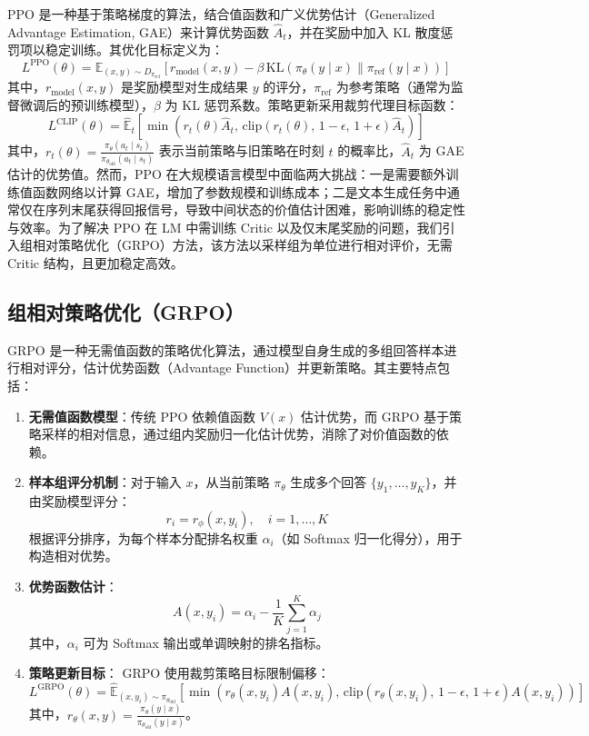 \documentclass{pkuthesis}
\begin{document}
PPO 是一种基于策略梯度的算法，结合值函数和广义优势估计（Generalized Advantage Estimation, GAE）来计算优势函数 \( \hat{A}_t \)，并在奖励中加入 KL 散度惩罚项以稳定训练。其优化目标定义为：
\[
L^{\text{PPO}}(\theta) = \mathbb{E}_{(x, y) \sim D_{\pi_{\text{ref}}}} \left[ r_{\text{model}}(x, y) - \beta \, \text{KL}(\pi_{\theta}(y \mid x) \| \pi_{\text{ref}}(y \mid x)) \right]
\]
其中，\( r_{\text{model}}(x, y) \) 是奖励模型对生成结果 \( y \) 的评分，\( \pi_{\text{ref}} \) 为参考策略（通常为监督微调后的预训练模型），\( \beta \) 为 KL 惩罚系数。策略更新采用裁剪代理目标函数：
\[
L^{\text{CLIP}}(\theta) = \hat{\mathbb{E}}_t \left[ \min \left( r_t(\theta) \hat{A}_t, \, \text{clip}(r_t(\theta), \, 1 - \epsilon, \, 1 + \epsilon) \hat{A}_t \right) \right]
\]
其中，\( r_t(\theta) = \frac{\pi_{\theta}(a_t \mid s_t)}{\pi_{\theta_{\text{old}}}(a_t \mid s_t)} \) 表示当前策略与旧策略在时刻 \( t \) 的概率比，\( \hat{A}_t \) 为 GAE 估计的优势值。然而，PPO 在大规模语言模型中面临两大挑战：一是需要额外训练值函数网络以计算 GAE，增加了参数规模和训练成本；二是文本生成任务中通常仅在序列末尾获得回报信号，导致中间状态的价值估计困难，影响训练的稳定性与效率。为了解决 PPO 在 LM 中需训练 Critic 以及仅末尾奖励的问题，我们引入组相对策略优化（GRPO）方法，该方法以采样组为单位进行相对评价，无需 Critic 结构，且更加稳定高效。

\subsection{组相对策略优化（GRPO）}
GRPO \cite{shao2024deepseekmath}是一种无需值函数的策略优化算法，通过模型自身生成的多组回答样本进行相对评分，估计优势函数（Advantage Function）并更新策略。其主要特点包括：
\begin{enumerate}
    \item \textbf{无需值函数模型}：传统 PPO 依赖值函数 \( V(x) \) 估计优势，而 GRPO 基于策略采样的相对信息，通过组内奖励归一化估计优势，消除了对价值函数的依赖。
    \item \textbf{样本组评分机制}：对于输入 \( x \)，从当前策略 \( \pi_{\theta} \) 生成多个回答 \( \{y_1, \dots, y_K\} \)，并由奖励模型评分：
    \[
    r_i = r_{\phi}(x, y_i), \quad i = 1, \dots, K
    \]
    根据评分排序，为每个样本分配排名权重 \( \alpha_i \)（如 Softmax 归一化得分），用于构造相对优势。
    \item \textbf{优势函数估计}：
    \[
    A(x, y_i) = \alpha_i - \frac{1}{K} \sum_{j=1}^K \alpha_j
    \]
    其中，\( \alpha_i \) 可为 Softmax 输出或单调映射的排名指标。
    \item \textbf{策略更新目标}：
    GRPO 使用裁剪策略目标限制偏移：
    \[
    L^{\text{GRPO}}(\theta) = \hat{\mathbb{E}}_{(x, y_i) \sim \pi_{\theta_{\text{old}}}} \left[ \min \left( r_{\theta}(x, y_i) A(x, y_i), \, \text{clip}(r_{\theta}(x, y_i), \, 1 - \epsilon, \, 1 + \epsilon) A(x, y_i) \right) \right]
    \]
    其中，\( r_{\theta}(x, y) = \frac{\pi_{\theta}(y \mid x)}{\pi_{\theta_{\text{old}}}(y \mid x)} \)。
\end{enumerate}
\end{document}
